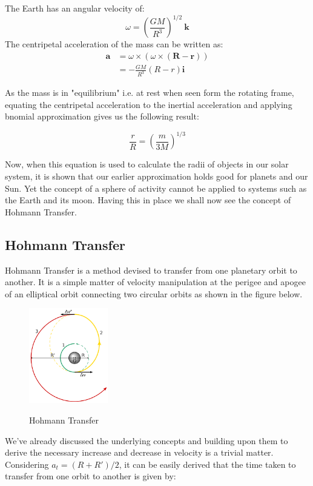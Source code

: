 \documentclass[12pt, letterpaper]{article}
\begin{document}
The Earth has an angular velocity of:
\[
	\omega = \left(\frac{GM}{R^3}\right)^{1/2} \: \mathbf{k}
\]
The centripetal acceleration of the mass can be written as:
\begin{equation}
\begin{split}
	\mathbf{a} & = \omega \times(\omega \times (\mathbf{R} - \mathbf{r}))\\
				& = - \frac{GM}{R^3}(R - r)\mathbf{i}
\end{split}
\end{equation}

As the mass is in "equilibrium" i.e. at rest when seen form the rotating frame, equating the centripetal acceleration to the inertial acceleration and applying bnomial approximation gives us the following result:

\[
	\frac{r}{R} = \left( \frac{m}{3M} \right)^{1/3}
\]

Now, when this equation is used to calculate the radii of objects in our solar system, it is shown that our earlier approximation holds good for planets and our Sun. Yet the concept of a sphere of activity cannot be applied to systems such as the Earth and its moon. Having this in place we shall now see the concept of Hohmann Transfer.

\subsection{Hohmann Transfer}
Hohmann Transfer is a method devised to transfer from one planetary orbit to another. It is a simple matter of velocity manipulation at the perigee and apogee of an elliptical orbit connecting two circular orbits as shown in the figure below. 

\begin{figure}[h!]
	\centering
    \includegraphics[width = 130px]{Hohmann}
    \label{fig:Hohmann}
    \caption{Hohmann Transfer}
\end{figure}

We've already discussed the underlying concepts and building upon them to derive the necessary increase and decrease in velocity is a trivial matter. Considering $a_t = (R + R')/2$, it can be easily derived that the time taken to transfer from one orbit to another is given by:
\end{document}
